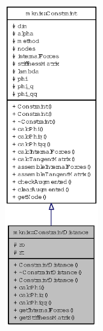 \begin{figure}[H]
\begin{center}
\leavevmode
\includegraphics[height=400pt]{classmknix_1_1ConstraintDistance__coll__graph}
\end{center}
\end{figure}
